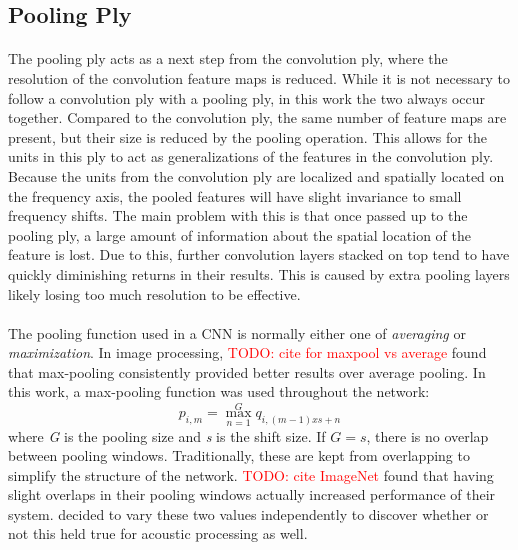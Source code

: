 \documentclass[letterpaper]{article}
\newcommand{\TODO}[1]{\textcolor{red}{TODO: #1}}
\begin{document}
\subsection*{Pooling Ply}

\paragraph{}The pooling ply acts as a next step from the convolution ply, where the resolution of the convolution feature maps is reduced. While it is not necessary to follow a convolution ply with a pooling ply, in this work the two always occur together. Compared to the convolution ply, the same number of feature maps are present, but their size is reduced by the pooling operation. This allows for the units in this ply to act as generalizations of the features in the convolution ply. Because the units from the convolution ply are localized and spatially located on the frequency axis, the pooled features will have slight invariance to small frequency shifts. The main problem with this is that once passed up to the pooling ply, a large amount of information about the spatial location of the feature is lost. Due to this, further convolution layers stacked on top tend to have quickly diminishing returns in their results. This is caused by extra pooling layers likely losing too much resolution to be effective.

\paragraph{}The pooling function used in a CNN is normally either one of \textit{averaging} or \textit{maximization}. In image processing, \TODO{cite for maxpool vs average} found that max-pooling consistently provided better results over average pooling. In this work, a max-pooling function was used throughout the network:
\begin{equation*}
p_{i,m} = \max_{n=1}^{G} q_{i, (m-1)xs+n}
\end{equation*}
where \textit{G} is the pooling size and \textit{s} is the shift size. If $G=s$, there is no overlap between pooling windows. Traditionally, these are kept from overlapping to simplify the structure of the network. \TODO{cite ImageNet} found that having slight overlaps in their pooling windows actually increased performance of their system. \cite{DBLP:journals/taslp/Abdel-HamidMJDPY14} decided to vary these two values independently to discover whether or not this held true for acoustic processing as well. 
\end{document}
